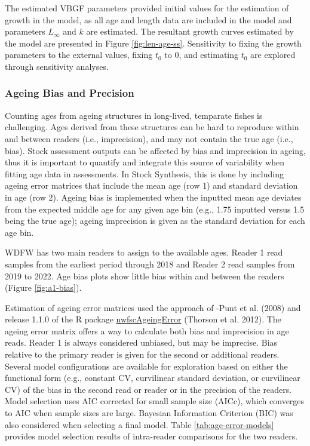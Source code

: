 \documentclass[11pt,
  english,
  letterpaper,
]{article}
\begin{document}
The estimated VBGF parameters provided initial values for the estimation of growth in the model, as all age and length data are included in the model and parameters \(L_{\infty}\) and \(k\) are estimated. The resultant growth curves estimated by the model are presented in Figure \ref{fig:len-age-ss}. Sensitivity to fixing the growth parameters to the external values, fixing \(t_0\) to 0, and estimating \(t_0\) are explored through sensitivity analyses.

\hypertarget{ageing-bias-and-precision}{%
\subsubsection{Ageing Bias and Precision}\label{ageing-bias-and-precision}}

Counting ages from ageing structures in long-lived, temparate fishes is challenging. Ages derived from these structures can be hard to reproduce within and between readers (i.e., imprecision), and may not contain the true age (i.e., bias). Stock assessment outputs can be affected by bias and imprecision in ageing, thus it is important to quantify and integrate this source of variability when fitting age data in assessments. In Stock Synthesis, this is done by including ageing error matrices that include the mean age (row 1) and standard deviation in age (row 2). Ageing bias is implemented when the inputted mean age deviates from the expected middle age for any given age bin (e.g., 1.75 inputted versus 1.5 being the true age); ageing imprecision is given as the standard deviation for each age bin.

WDFW has two main readers to assign to the available ages. Reader 1 read samples from the earliest period through 2018 and Reader 2 read samples from 2019 to 2022. Age bias plots show little bias within and between the readers (Figure \ref{fig:a1-bias}).

Estimation of ageing error matrices used the approach of -Punt et al. (2008) and release 1.1.0 of the R package \href{https://github.com/pfmc-assessments/nwfscAgeingError}{nwfscAgeingError} (Thorson et al. 2012). The ageing error matrix offers a way to calculate both bias and imprecision in age reads. Reader 1 is always considered unbiased, but may be imprecise. Bias relative to the primary reader is given for the second or additional readers. Several model configurations are available for exploration based on either the functional form (e.g., constant CV, curvilinear standard deviation, or curvilinear CV) of the bias in the second read or reader or in the precision of the readers. Model selection uses AIC corrected for small sample size (AICc), which converges to AIC when sample sizes are large. Bayesian Information Criterion (BIC) was also considered when selecting a final model. Table \ref{tab:age-error-models} provides model selection results of intra-reader comparisons for the two readers.
\end{document}
